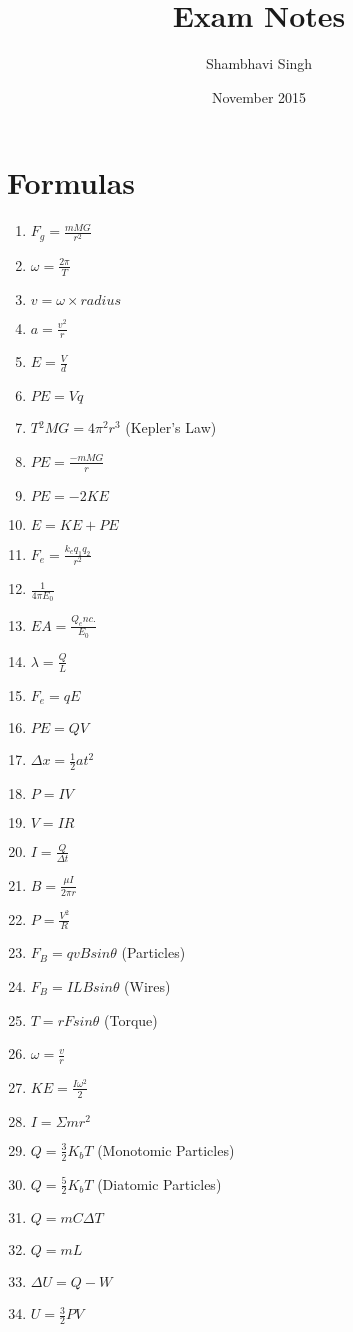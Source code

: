 \documentclass{article}
\title{Exam Notes}
\author{Shambhavi Singh }
\date{November 2015}
\begin{document}
\maketitle

\section{Formulas}
\begin{enumerate}
\item $F_g=\frac{mMG}{r^2}$
\item $\omega=\frac{2\pi}{T}$
\item $v=\omega \times radius$
\item $a=\frac{v^{2}}{r}$
\item $E=\frac{V}{d}$
\item $PE=Vq$
\item $T{^2}MG=4\pi{^2}r{^3}$ (Kepler's Law)
\item $PE=\frac{-mMG}{r}$
\item $PE=-2KE$
\item $E=KE+PE$
\item $F_e=\frac{k_eq_1q_2}{r{^2}}$
\item $\frac{1}{4\pi E_0}$
\item $EA=\frac{Q_enc.}{E_0}$
\item $\lambda=\frac{Q}{L}$
\item $F_e=qE$
\item $PE=QV$
\item $\Delta x=\frac{1}{2}at{^2}$
\item $P=IV$
\item $V=IR$
\item $I=\frac{Q}{\Delta t}$
\item $B=\frac{\mu I}{2\pi r}$
\item $P= \frac{V{^2}}{R}$
\item $F_B=qvBsin\theta$ (Particles)
\item $F_B=ILBsin\theta$ (Wires)
\item $T=rFsin\theta$ (Torque)
\item $\omega=\frac{v}{r}$
\item $KE=\frac{I\omega{^2}}{2}$
\item $I=\Sigma mr{^2}$
\item $Q=\frac{3}{2}K_bT$ (Monotomic Particles)
\item $Q=\frac{5}{2}K_bT$ (Diatomic Particles)
\item $Q=mC\Delta T$
\item $Q=mL$
\item $\Delta U=Q-W$
\item $U=\frac{3}{2}PV$

\end{enumerate}
\end{document}
